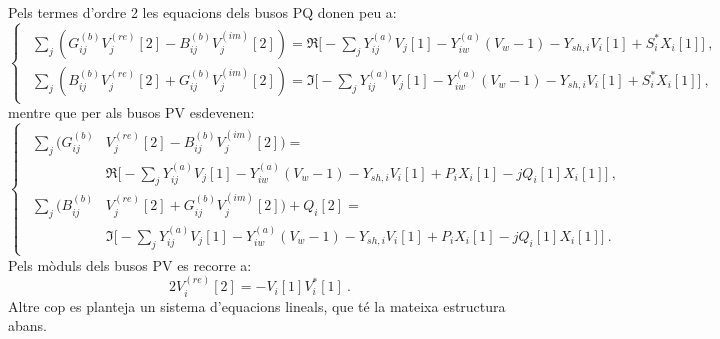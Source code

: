 Pels termes d'ordre 2 les equacions dels busos PQ donen peu a:
\begin{equation}
    \begin{cases}
    \begin{split}
    \sum_{j}(G^{(b)}_{ij}V^{(re)}_j[2]-B^{(b)}_{ij}V^{(im)}_j[2]) = \Re\biggl[-\sum_{j}Y^{(a)}_{ij}V_j[1]
    -Y^{(a)}_{iw}(V_w-1)-Y_{sh,i}V_i[1]+S^*_iX_i[1]\biggr]\ ,\\
    \sum_{j}(B^{(b)}_{ij}V^{(re)}_j[2]+G^{(b)}_{ij}V^{(im)}_j[2]) = \Im\biggl[-\sum_{j}Y^{(a)}_{ij}V_j[1]
    -Y^{(a)}_{iw}(V_w-1)-Y_{sh,i}V_i[1]+S^*_iX_i[1]\biggr]\ ,
    \end{split}
\end{cases}
        \label{eq:F9PQ3}
\end{equation}
mentre que per als busos PV esdevenen:
\begin{equation}
    \begin{cases}
    \begin{split}
    \sum_{j}(G^{(b)}_{ij}&V^{(re)}_j[2]-B^{(b)}_{ij}V^{(im)}_j[2]) =\\
    &\Re\biggl[-\sum_{j}Y^{(a)}_{ij}V_j[1]
    -Y^{(a)}_{iw}(V_w-1)-Y_{sh,i}V_i[1]+P_iX_i[1]-jQ_i[1]X_i[1]\biggr]\ ,\\
    \sum_{j}(B^{(b)}_{ij}&V^{(re)}_j[2]+G^{(b)}_{ij}V^{(im)}_j[2])+Q_i[2] =\\
    &\Im\biggl[-\sum_{j}Y^{(a)}_{ij}V_j[1]
     -Y^{(a)}_{iw}(V_w-1)-Y_{sh,i}V_i[1]+P_iX_i[1]-jQ_i[1]X_i[1]\biggr]\ .
    \end{split}
\end{cases}
        \label{eq:F9PV3}
\end{equation}
Pels mòduls dels busos PV es recorre a:
\begin{equation}
    2V^{(re)}_i[2]=-V_i[1]V^*_i[1]\ .
        \label{eq:F14x}
\end{equation}
Altre cop es planteja un sistema d'equacions lineals, que té la mateixa estructura abans.

